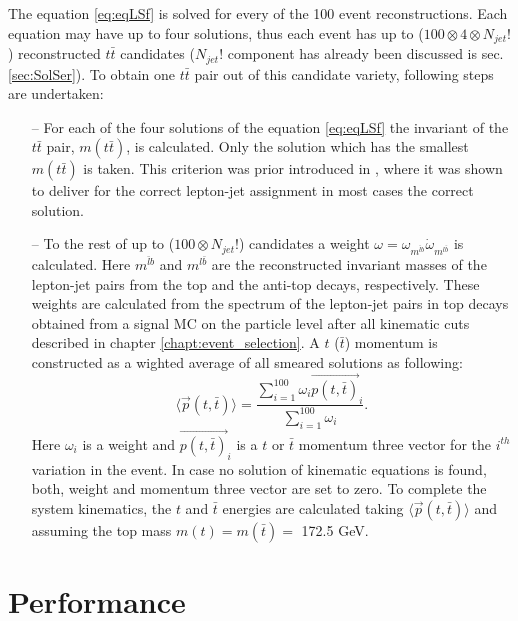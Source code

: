 The equation \ref{eq:eqLSf} is solved for every of the 100 event reconstructions. Each equation may have up to four solutions, thus each event
has up to ($100 \otimes 4 \otimes N_{jet}!$) reconstructed $t\bar{t}$ candidates ($N_{jet}!$ component has already been discussed is sec. \ref{sec:SolSer}). 
To obtain one $t\bar{t}$ pair out of this candidate variety, following steps are undertaken:

\begin{itemize}
 \item [--] For each of the four solutions of the equation \ref{eq:eqLSf} the invariant of the $t\bar{t}$ pair, $m(t\bar{t})$, is calculated. Only
 the solution which has the smallest $m(t\bar{t})$ is taken. This criterion was prior introduced in \cite{PhysRevD.73.112006}, where it was shown to
 deliver for the correct lepton-jet assignment in most cases the correct solution.
 \item [--] To the rest of up to ($100 \otimes N_{jet}!$) candidates a weight $\omega = \omega_{m^{\bar{l}b}} \dot \omega_{m^{l\bar{b}}}$
 is calculated. Here $m^{\bar{l}b}$ and $m^{l\bar{b}}$ are the reconstructed invariant masses of the lepton-jet pairs from the top and the anti-top 
 decays, respectively. These weights are calculated from the spectrum of the lepton-jet pairs in top decays obtained from a signal MC on the 
 particle level after all kinematic cuts described in chapter \ref{chapt:event_selection}. A $t$ ($\bar{t}$) momentum is constructed as a wighted 
 average of all smeared solutions as following:
 \begin{equation}
  \langle{\vec{p}(t,\bar{t})}\rangle = \frac{\sum\limits_{i=1}^{100} \omega_{i} \vec{p(t,\bar{t})}_i}{\sum\limits_{i=1}^{100} \omega_i}.
 \end{equation}
 Here $\omega_i$ is a weight and $\vec{p(t, \bar{t})}_{i}$ is a $t$ or $\bar{t}$ momentum three vector for the $i^{th}$ variation in the event. 
 In case no solution of kinematic equations is found, both, weight and momentum three vector are set to zero. To complete the system kinematics,
 the $t$ and $\bar{t}$ energies are calculated taking $\langle{\vec{p}(t,\bar{t})}\rangle$ and assuming the top mass $m(t) = m(\bar{t}) = $ 172.5 GeV.
\end{itemize}

\section{Performance}\label{sec:kinRecPerf}

